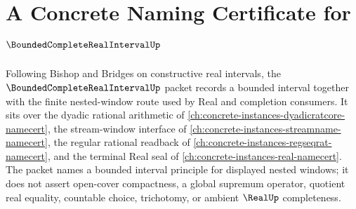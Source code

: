 \chapter{A Concrete Naming Certificate for $\BoundedCompleteRealIntervalUp$}
\label{ch:concrete-instances-bounded-complete-real-interval-namecert}

Following Bishop and Bridges on constructive real intervals, the $\BoundedCompleteRealIntervalUp$ packet records a bounded interval together with the finite nested-window route used by Real and completion consumers. It sits over the dyadic rational arithmetic of \autoref{ch:concrete-instances-dyadicratcore-namecert}, the stream-window interface of \autoref{ch:concrete-instances-streamname-namecert}, the regular rational readback of \autoref{ch:concrete-instances-regseqrat-namecert}, and the terminal Real seal of \autoref{ch:concrete-instances-real-namecert}. The packet names a bounded interval principle for displayed nested windows; it does not assert open-cover compactness, a global supremum operator, quotient real equality, countable choice, trichotomy, or ambient $\RealUp$ completeness.

